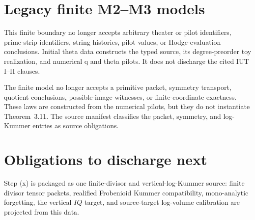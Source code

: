\section{Legacy finite M2--M3 models}

\begin{definition}
  \label{def:iut-i-hodge-theater-realization-obligation}
  \leanok
  This finite boundary no longer accepts arbitrary theater or
  pilot identifiers, prime-strip identifiers, string histories, pilot values,
  or Hodge-evaluation conclusions.  Initial theta data constructs the typed
  source, its degree-preorder toy realization, and numerical q and theta
  pilots. It does not discharge the cited IUT I--II clauses.
\end{definition}

\begin{definition}
  \label{def:constructed-theorem-311-obligation}
  \leanok
  The finite model no longer accepts a primitive packet,
  symmetry transport, quotient conclusions, possible-image witnesses, or
  finite-coordinate exactness. These laws are constructed from the numerical
  pilots, but they do not instantiate Theorem~3.11. The source manifest
  classifies the packet, symmetry, and log-Kummer entries as source
  obligations.
\end{definition}

\section{Obligations to discharge next}

\begin{definition}
  \label{def:step-x-logkummer-package}
  \leanok
  Step (x) is packaged as one finite-divisor and vertical-log-Kummer source:
  finite divisor tensor packets, realified Frobenioid Kummer compatibility,
  mono-analytic forgetting, the vertical \(IQ\) target, and source-target
  log-volume calibration are projected from this data.
\end{definition}


